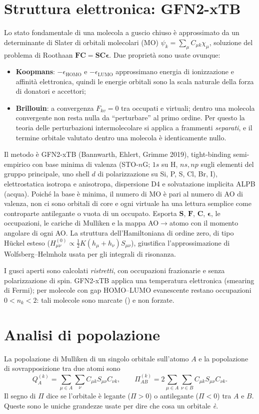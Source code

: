 \documentclass[11pt,a4paper]{report}
\newcommand{\code}[1]{\texttt{\detokenize{#1}}}
\newcommand{\vb}[1]{\bm{#1}}
\begin{document}
\section{Struttura elettronica: GFN2-xTB}
Lo stato fondamentale di una molecola a guscio chiuso è approssimato da un determinante di Slater
di orbitali molecolari (MO) $\psi_k=\sum_\mu C_{\mu k}\chi_\mu$, soluzione del problema di Roothaan
$\vb{F}\vb{C}=\vb{S}\vb{C}\vb{\epsilon}$. Due proprietà sono usate ovunque:
\begin{itemize}
\item \textbf{Koopmans}: $-\epsilon_{\mathrm{HOMO}}$ e $-\epsilon_{\mathrm{LUMO}}$ approssimano energia di
  ionizzazione e affinità elettronica, quindi le energie orbitali sono la scala naturale della forza
  di donatori e accettori;
\item \textbf{Brillouin}: a convergenza $F_{kv}=0$ tra occupati e virtuali; dentro una molecola
  convergente non resta nulla da \enquote{perturbare} al primo ordine. Per questo la teoria delle
  perturbazioni intermolecolare si applica a frammenti \emph{separati}, e il termine orbitale valutato
  dentro una molecola è identicamente nullo.
\end{itemize}
Il metodo è GFN2-xTB (Bannwarth, Ehlert, Grimme 2019), tight-binding semi-empirico con base minima di
valenza (STO-$n$G; $1s$ su H, $ns,np$ sugli elementi del gruppo principale, uno shell $d$ di
polarizzazione su Si, P, S, Cl, Br, I), elettrostatica isotropa e anisotropa, dispersione D4 e
solvatazione implicita ALPB (acqua). Poiché la base è minima, il numero di MO è pari al numero di AO
di valenza, non ci sono orbitali di core e ogni virtuale ha una lettura semplice come controparte
antilegante o vuota di un occupato. Esporta $\vb{S}$, $\vb{F}$, $\vb{C}$, $\vb{\epsilon}$, le
occupazioni, le cariche di Mulliken e la mappa AO$\to$atomo con il momento angolare di ogni AO. La
struttura dell'Hamiltoniana di ordine zero, di tipo Hückel esteso
($H^{(0)}_{\mu\nu}\propto\tfrac12K(h_\mu+h_\nu)S_{\mu\nu}$), giustifica l'approssimazione di
Wolfsberg--Helmholz usata per gli integrali di risonanza.

I gusci aperti sono calcolati \emph{ristretti}, con occupazioni frazionarie e senza polarizzazione di
spin. GFN2-xTB applica una temperatura elettronica (smearing di Fermi); per molecole con gap
HOMO--LUMO evanescente restano occupazioni $0<n_k<2$: tali molecole sono marcate
(\code{fermi_smeared}) e non forzate.

\section{Analisi di popolazione}
La popolazione di Mulliken di un singolo orbitale sull'atomo $A$ e la popolazione di sovrapposizione
tra due atomi sono
\begin{equation}
Q^{(k)}_A=\sum_{\mu\in A}\sum_\nu C_{\mu k}S_{\mu\nu}C_{\nu k},\qquad
\Pi^{(k)}_{AB}=2\sum_{\mu\in A}\sum_{\nu\in B}C_{\mu k}S_{\mu\nu}C_{\nu k}.
\end{equation}
Il segno di $\Pi$ dice se l'orbitale è legante ($\Pi>0$) o antilegante ($\Pi<0$) tra $A$ e $B$.
Queste sono le uniche grandezze usate per dire che cosa un orbitale \emph{è}.
\end{document}
